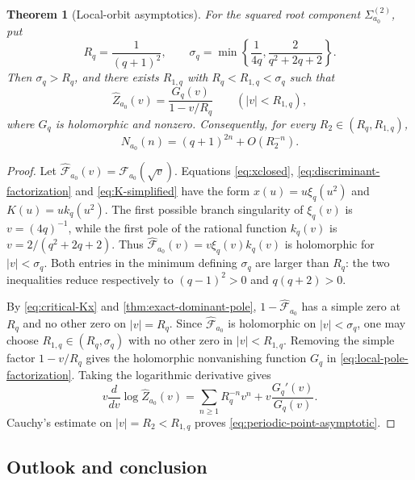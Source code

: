 \documentclass[11pt,reqno]{amsart}
\numberwithin{equation}{section}
\newtheorem{theorem}{Theorem}[section]
\theoremstyle{definition}
\theoremstyle{remark}
\newcommand{\cF}{\mathcal F}
\begin{document}
\begin{theorem}[Local-orbit asymptotics]
\label{thm:local-orbit-counting}
For the squared root component $\Sigma^{(2)}_{a_0}$, put
\begin{equation}\label{eq:Rq-sigmaq}
 R_q=\frac1{(q+1)^2},
 \qquad
 \sigma_q=\min\left\{\frac1{4q},
 \frac2{q^2+2q+2}\right\}.
\end{equation}
Then $\sigma_q>R_q$, and there exists $R_{1,q}$ with
$R_q<R_{1,q}<\sigma_q$ such that
\begin{equation}\label{eq:local-pole-factorization}
 \widehat Z_{a_0}(v)
 =\frac{G_q(v)}{1-v/R_q}
 \qquad(|v|<R_{1,q}),
\end{equation}
where $G_q$ is holomorphic and nonzero.  Consequently, for every
$R_2\in(R_q,R_{1,q})$,
\begin{equation}\label{eq:periodic-point-asymptotic}
 N_{a_0}(n)=(q+1)^{2n}+O(R_2^{-n}).
\end{equation}
\end{theorem}

\begin{proof}
Let $\widehat{\cF}_{a_0}(v)=\cF_{a_0}(\sqrt v)$.  Equations
\eqref{eq:xclosed}, \eqref{eq:discriminant-factorization} and
\eqref{eq:K-simplified} have the form $x(u)=u\xi_q(u^2)$ and
$K(u)=u k_q(u^2)$.  The first possible branch singularity of $\xi_q(v)$ is
$v=(4q)^{-1}$, while the first pole of the rational function $k_q(v)$ is
$v=2/(q^2+2q+2)$.  Thus
$\widehat{\cF}_{a_0}(v)=v\xi_q(v)k_q(v)$ is holomorphic for
$|v|<\sigma_q$.  Both entries in the minimum defining $\sigma_q$ are larger
than $R_q$: the two inequalities reduce respectively to
$(q-1)^2>0$ and $q(q+2)>0$.

By \eqref{eq:critical-Kx} and \cref{thm:exact-dominant-pole},
$1-\widehat{\cF}_{a_0}$ has a simple zero at $R_q$ and no other zero on
$|v|=R_q$.  Since $\widehat{\cF}_{a_0}$ is holomorphic on
$|v|<\sigma_q$, one may choose
$R_{1,q}\in(R_q,\sigma_q)$ with no other zero in $|v|<R_{1,q}$.
Removing the simple factor $1-v/R_q$ gives the holomorphic nonvanishing
function $G_q$ in \eqref{eq:local-pole-factorization}.  Taking the logarithmic
derivative gives
\[
 v\frac{d}{dv}\log\widehat Z_{a_0}(v)
 =\sum_{n\ge1}R_q^{-n}v^n+v\frac{G_q'(v)}{G_q(v)}.
\]
Cauchy's estimate on $|v|=R_2<R_{1,q}$ proves
\eqref{eq:periodic-point-asymptotic}.
\end{proof}

\subsection{Outlook and conclusion}
\label{sec:questions}
\end{document}

